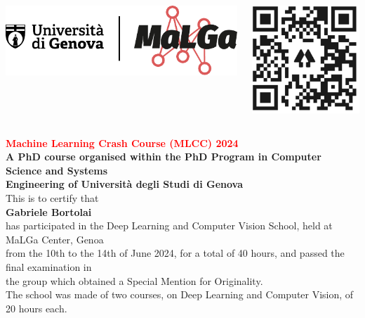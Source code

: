 \documentclass{beamer}%
\begin{document}
%
\normalsize%

\begin{frame}
                    \begin{columns}
                    \begin{block}{}
                    \includegraphics[scale = 0.5]{Figures/MaLGa_orizzontale_esteso.pdf}
                    \end{block}

                    \begin{block}{}
                    \raggedleft\includegraphics[scale = 0.5]{Figures/QR_Code}
                    \end{block}
                    \end{columns}  

                    \begin{center}
                    \textcolor{red}{\fontsize{28pt}{28pt}\selectfont\textbf{Machine Learning Crash Course (MLCC) 2024}}\\

                    \textbf{A PhD course organised within the PhD Program in Computer Science and Systems\\
                    Engineering of Università degli Studi di Genova}\\
                    This is to certify that\\
                    \textbf{Gabriele Bortolai}\\
                    has participated in the Deep Learning and Computer Vision School, held at MaLGa Center, Genoa\\
                    from the 10th to the 14th of June 2024, for a total of 40 hours, and passed the final examination in\\
                    the group which obtained a Special Mention for Originality.\\
                    The school was made of two courses, on Deep Learning and Computer Vision, of 20 hours each.\\
                    \end{center}


\end{frame}
\end{document}
